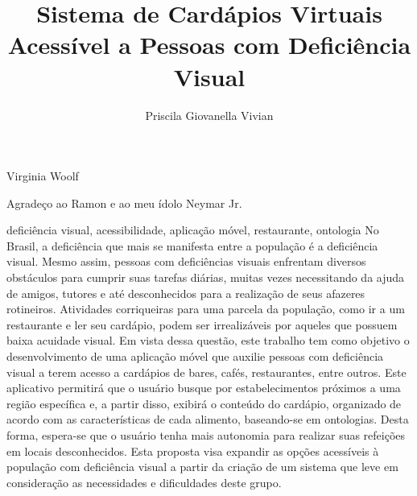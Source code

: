 \documentclass[portuguese,oneside]{tcc}
\author{Priscila Giovanella Vivian}
\title{Sistema de Cardápios Virtuais Acessível a Pessoas com Deficiência Visual}
	{A Virtual Menu System Accessible to Visually Impaired People}
\begin{document}
		
		
		{Virginia Woolf}
		
		
		\begin{agradecimentos}
			
			Agradeço ao Ramon e ao meu ídolo Neymar Jr.
		\end{agradecimentos}
		
		\begin{resumo}{deficiência visual, acessibilidade, aplicação móvel, restaurante, ontologia}
			No Brasil, a deficiência que mais se manifesta entre a população é a deficiência visual. Mesmo assim, pessoas com deficiências visuais enfrentam diversos obstáculos para cumprir suas tarefas diárias, muitas vezes necessitando da ajuda de amigos, tutores e até desconhecidos para a realização de seus afazeres rotineiros. Atividades corriqueiras para uma parcela da população, como ir a um restaurante e ler seu cardápio, podem ser irrealizáveis por aqueles que possuem baixa acuidade visual. Em vista dessa questão, este trabalho tem como objetivo o desenvolvimento de uma aplicação móvel que auxilie pessoas com deficiência visual a terem acesso a cardápios de bares, cafés, restaurantes, entre outros. Este aplicativo permitirá que o usuário busque por estabelecimentos próximos a uma região específica e, a partir disso, exibirá o conteúdo do cardápio, organizado de acordo com as características de cada alimento, baseando-se em ontologias. Desta forma, espera-se que o usuário tenha mais autonomia para realizar suas refeições em locais desconhecidos. Esta proposta visa expandir as opções acessíveis à população com deficiência visual a partir da criação de um sistema que leve em consideração as necessidades e dificuldades deste grupo.
		\end{resumo}
		
\end{document}
